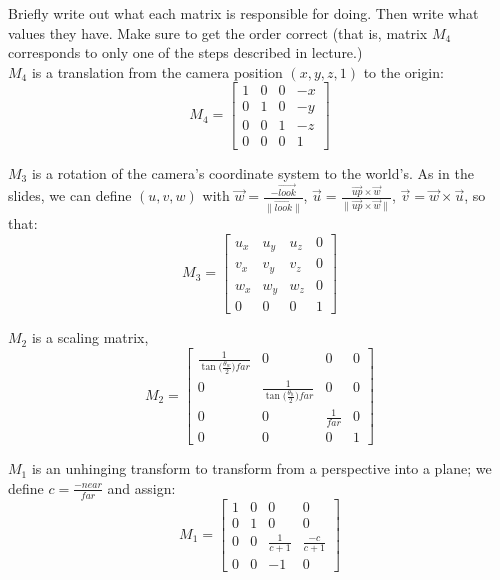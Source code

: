\documentclass[10pt,twocolumn]{article}
\begin{document}
\begin{framed}
\noindent {\bf [1/2 pt. each]} Briefly write out what each matrix is responsible for doing. Then write what values they have. Make sure to get the order correct (that is, matrix $M_4$ corresponds to only one of the steps described in lecture.)\\

$M_4$ is a translation from the camera position $(x, y, z, 1)$ to the origin:
\[M_4 = \begin{bmatrix}
    1 & 0 & 0 & -x \\
    0 & 1 & 0 & -y \\
    0 & 0 & 1 & -z \\
    0 & 0 & 0 & 1
\end{bmatrix}\]

$M_3$ is a rotation of the camera's coordinate system to the world's. As in the slides, we can define $(u, v, w)$ with $\vec{w} = \frac{-\vec{look}}{\lVert\vec{look}\rVert}$, $\vec{u} = \frac{\vec{up} \times \vec{w}}{\lVert\vec{up} \times \vec{w}\rVert}$, $\vec{v} = \vec{w} \times \vec{u}$, so that:
\[M_3 = \begin{bmatrix}
    u_x & u_y & u_z & 0 \\
    v_x & v_y & v_z & 0 \\
    w_x & w_y & w_z & 0 \\
    0 & 0 & 0 & 1
\end{bmatrix}\]

$M_2$ is a scaling matrix,
\[M_2 = \begin{bmatrix}
    \frac{1}{\tan\big(\frac{\theta_w}{2}\big) far} & 0 & 0 & 0 \\
    0 & \frac{1}{\tan\big(\frac{\theta_h}{2}\big) far} & 0 & 0 \\
    0 & 0 & \frac{1}{far} & 0 \\
    0 & 0 & 0 & 1
\end{bmatrix}\]

$M_1$ is an unhinging transform to transform from a perspective into a plane; we define $c = \frac{-near}{far}$ and assign:
\[M_1 = \begin{bmatrix}
    1 & 0 & 0 & 0 \\
    0 & 1 & 0 & 0 \\
    0 & 0 & \frac{1}{c+1} & \frac{-c}{c+1} \\
    0 & 0 & -1 & 0
\end{bmatrix}\]
\vspace{3em}

\end{framed}
\end{document}
